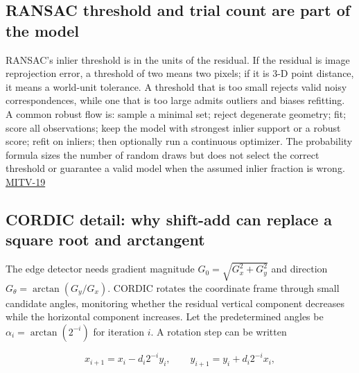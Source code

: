 \subsection{RANSAC threshold and trial count are part of the model}\label{04-visual-computing-ii-ch032-ransac-threshold-and-trial-count-are-part-of-the-model}

\hypertarget{04-visual-computing-ii-ch032-ransac-threshold-and-trial-count-are-part-of-the-model}{}

RANSAC's inlier threshold is in the units of the residual. If the residual is image reprojection error, a threshold of two means two pixels; if it is 3-D point distance, it means a world-unit tolerance. A threshold that is too small rejects valid noisy correspondences, while one that is too large admits outliers and biases refitting. A common robust flow is: sample a minimal set; reject degenerate geometry; fit; score all observations; keep the model with strongest inlier support or a robust score; refit on inliers; then optionally run a continuous optimizer. The probability formula sizes the number of random draws but does not select the correct threshold or guarantee a valid model when the assumed inlier fraction is wrong. \hyperref[04-visual-computing-ii-ch036-mitv-19---absolute-orientation-in-closed-form-outliers-and-robustness-ransac]{MITV-19}

\subsection{CORDIC detail: why shift-add can replace a square root and arctangent}\label{04-visual-computing-ii-ch032-cordic-detail-why-shift-add-can-replace-a-square-root-and-arctangent}

\hypertarget{04-visual-computing-ii-ch032-cordic-detail-why-shift-add-can-replace-a-square-root-and-arctangent}{}

The edge detector needs gradient magnitude \(G_0=\sqrt{G_x^2+G_y^2}\) and direction \(G_\theta=\arctan(G_y/G_x)\). CORDIC rotates the coordinate frame through small candidate angles, monitoring whether the residual vertical component decreases while the horizontal component increases. Let the predetermined angles be \(\alpha_i=\arctan(2^{-i})\) for iteration \(i\). A rotation step can be written

\[
x_{i+1}=x_i-d_i2^{-i}y_i,\qquad y_{i+1}=y_i+d_i2^{-i}x_i,
\]

